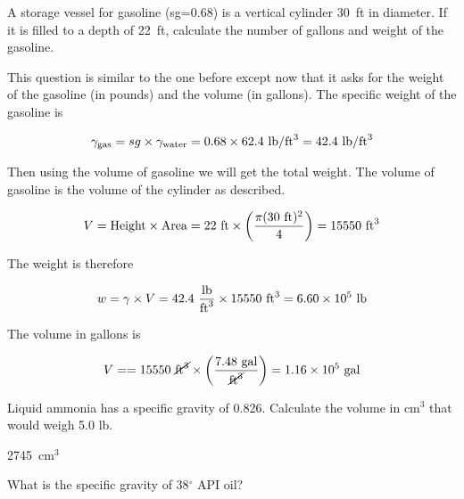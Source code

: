 \documentclass[12pt]{article}
\begin{document}
\begin{question}
A storage vessel for gasoline (sg=0.68) is a vertical cylinder 30~ft in diameter.  If it is filled to a depth of 22~ft, calculate the number of gallons and weight of the gasoline.

\begin{solution}
  This question is similar to the one before except now that it asks for the weight of the gasoline (in pounds) and the volume (in gallons).  The specific weight of the gasoline is

  \begin{align*}
    \gamma_{\rm gas}=sg\times \gamma_{\rm water}=0.68\times 62.4~\mathrm{lb}/\mathrm{ft}^3=42.4~\mathrm{lb}/\mathrm{ft}^3
  \end{align*}

  Then using the volume of gasoline we will get the total weight.  The volume of gasoline is the volume of the cylinder as described.

  \begin{align*}
      V={\rm Height}\times {\rm Area}=22~\mathrm{ft}\times \left(\frac{\pi (30~\mathrm{ft})^2}{4}\right)=15550~\mathrm{ft}^3
  \end{align*}

  The weight is therefore

  \begin{align*}
      w=\gamma\times V=42.4~\frac{\mathrm{lb}}{\mathrm{ft}^3}\times 15550~\mathrm{ft}^3 = 6.60\times 10^5~\mathrm{lb}
  \end{align*}

  The volume in gallons is

    \begin{align*}
      V==15550~\cancel{\mathrm{ft}^3}\times\left(\frac{7.48~\mathrm{gal}}{\cancel{\mathrm{ft}^3}}\right)=1.16\times 10^5~\mathrm{gal}
  \end{align*}

\end{solution}

\end{question}


\begin{question}
Liquid ammonia has a specific gravity of 0.826.  Calculate the volume in cm$^3$  that would weigh 5.0 lb.

\begin{solution}
 2745~cm$^3$
\end{solution}

\end{question}

\begin{question}
What is the specific gravity of 38$^\circ$ API oil?

\end{question}
\end{document}
